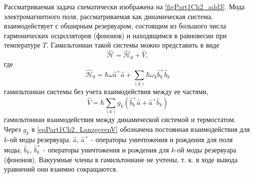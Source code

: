 Рассматриваемая задача схематически изображена на
\autoref{figPart1Ch2_add3}. Мода электромагнитного поля,
рассматриваемая как динамическая система, взаимодействует с обширным
резервуаром, состоящим из большого числа гармонических осцилляторов
(фононов) и находящимся в равновесии при температуре $T$. Гамильтониан
такой системы можно представить в виде
\begin{equation}
\hat{\mathcal{H}} = \hat{\mathcal{H}}_0 + \hat{V},
\nonumber
\end{equation}
где
\begin{equation}
 \hat{\mathcal{H}}_0 = \hbar\omega \hat{a}^{+}\hat{a} +
\sum_{(k)} \hbar\omega_k \hat{b}_k^{+} \hat{b}_k
\nonumber
\end{equation}
гамильтониан системы без учета взаимодействия между ее частями,
\begin{equation}
 \hat{V} = \hbar \sum_{(k)}g_k\left(
\hat{b}_k^{+}\hat{a} + \hat{a}^{+}\hat{b}_k
\right)
\label{eqPart1Ch2_LanzgevenV}
\end{equation}
гамильтониан взаимодействия между динамической системой и
термостатом. Через $g_k$ в \eqref{eqPart1Ch2_LanzgevenV} обозначена
постоянная взаимодействия для $k$-ой моды резервуара. $\hat{a}$,
$\hat{a}^{+}$ - операторы уничтожения и рождения для поля моды,
$\hat{b}_k$, $\hat{b}_{k}^{+}$ - операторы уничтожения и рождения для
$k$-ой моды резервуара (фононов). Вакуумные члены в гамильтониане не
учтены, т. к. в ходе вывода уравнений они взаимно сокращаются.

